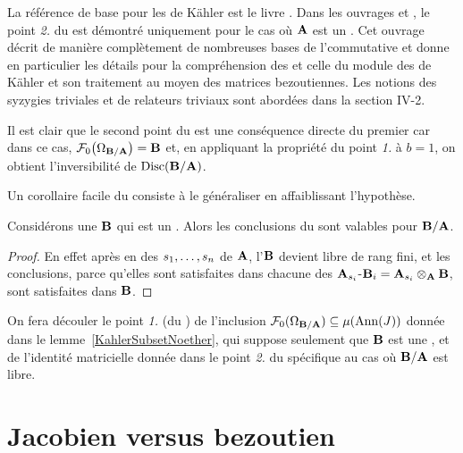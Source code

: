 \documentclass[12pt,twoside,a4paper]{article}
\begin{document}
\Note La référence de base pour les \diles de Kähler est le livre \cite{Kunz}. 
Dans les ouvrages \cite{CACM} et \cite{ACMC}, le point \textsl{2.} du  est démontré uniquement pour le cas où $\mathbf{A}$ est un \cdi. Cet ouvrage décrit de manière complètement \cov de nombreuses bases de l'\alg commutative et donne en particulier les détails \ncrs pour la compréhension des \idfs et celle du module des \diles de Kähler et son traitement au moyen des matrices bezoutiennes. 
Les notions des syzygies triviales et de relateurs triviaux sont abordées dans la section IV-2. 
\eoe  


\medskip Il est clair que le second point du  est une conséquence directe du premier car
dans ce cas, ${\cal F}_0\big(\Omega_{\mathbf{B}/\mathbf{A}}\big) = \mathbf{B}$ et, en appliquant
la propriété du point \textsl{1.} à $b=1$, on obtient l'inversibilité de
$\mathop{\mathrm{Disc}}\nolimits(\mathbf{B}/\mathbf{A})$.

\smallskip Un corollaire facile du \tho consiste à le généraliser en affaiblissant l'hypothèse.

\begin{corollary} \label{corNetteImpliesTracicEtale}
Considérons une \Alg $\mathbf{B}$ qui est un \Amo \ptf.  
Alors les conclusions du  sont valables pour $\mathbf{B}/\mathbf{A}$.
 \end{corollary}
%
\begin{proof}
En effet après \lon en des \eco $s_1,\ldots,s_n$ de $\mathbf{A}$, l'\alg $\mathbf{B}$ devient libre de rang fini, et les conclusions, parce qu'elles sont satisfaites dans chacune des $\mathbf{A}_{s_i}$-\alg $\mathbf{B}_i=\mathbf{A}_{s_i}\otimes_{\mathbf{A}}\mathbf{B}$, sont satisfaites dans $\mathbf{B}$.

\end{proof}
%

\smallskip On fera découler le point \textsl{1.} (du
) de l'inclusion ${\cal F}_0(\Omega_{\mathbf{B}/\mathbf{A}}) \subseteq \mu(\mathrm{Ann}(J))$ donnée dans le lemme~\ref{KahlerSubsetNoether}, qui suppose seulement que $\mathbf{B}$ est une \Alg \pf,
et de l'identité matricielle donnée dans le point \textsl{2.} du
 spécifique au cas où $\mathbf{B}/\mathbf{A}$ est
libre. 
  

\section{Jacobien versus bezoutien}\label{secJacBez}
\end{document}
